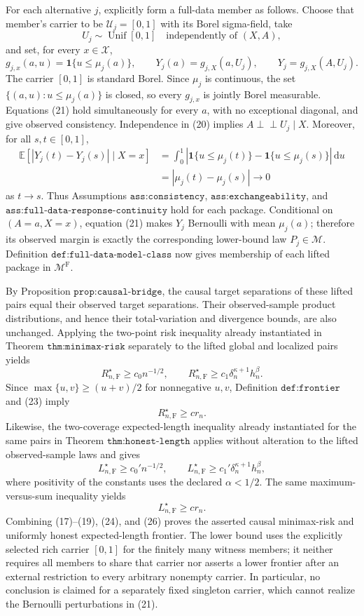 For each alternative \(j\), explicitly form a full-data member as follows. Choose that member's carrier to be \(\mathcal U_j=[0,1]\) with its Borel sigma-field, take
\[
 U_j\sim\operatorname{Unif}[0,1]
 \quad\text{independently of }(X,A),
\tag{20}
\]
and set, for every \(x\in\mathcal X\),
\[
 g_{j,x}(a,u)=\mathbf 1\{u\leq\mu_j(a)\},
 \qquad
 Y_j(a)=g_{j,X}(a,U_j),
 \qquad
 Y_j=g_{j,X}(A,U_j).
\tag{21}
\]
The carrier \([0,1]\) is standard Borel. Since \(\mu_j\) is continuous, the set \(\{(a,u):u\leq\mu_j(a)\}\) is closed, so every \(g_{j,x}\) is jointly Borel measurable. Equations (21) hold simultaneously for every \(a\), with no exceptional diagonal, and give observed consistency. Independence in (20) implies \(A\perp\!\!\!\perp U_j\mid X\). Moreover, for all \(s,t\in[0,1]\),
\[
\begin{aligned}
 \mathbb E[|Y_j(t)-Y_j(s)|\mid X=x]
 &=\int_0^1
   |\mathbf 1\{u\leq\mu_j(t)\}-\mathbf 1\{u\leq\mu_j(s)\}|\,\mathrm du\\
 &=|\mu_j(t)-\mu_j(s)|\longrightarrow0
\end{aligned}
\tag{22}
\]
as \(t\to s\). Thus Assumptions \(\texttt{ass:consistency}\), \(\texttt{ass:exchangeability}\), and \(\texttt{ass:full-data-response-continuity}\) hold for each package. Conditional on \((A=a,X=x)\), equation (21) makes \(Y_j\) Bernoulli with mean \(\mu_j(a)\); therefore its observed margin is exactly the corresponding lower-bound law \(P_j\in\mathcal M\). Definition \(\texttt{def:full-data-model-class}\) now gives membership of each lifted package in \(\mathcal M^{\mathrm F}\).

By Proposition \(\texttt{prop:causal-bridge}\), the causal target separations of these lifted pairs equal their observed target separations. Their observed-sample product distributions, and hence their total-variation and divergence bounds, are also unchanged. Applying the two-point risk inequality already instantiated in Theorem \(\texttt{thm:minimax-risk}\) separately to the lifted global and localized pairs yields
\[
 R_{n,\mathrm F}^\star
 \geq c_0 n^{-1/2},
 \qquad
 R_{n,\mathrm F}^\star
 \geq c_1\delta_n^{\kappa+1}h_n^\beta.
\tag{23}
\]
Since \(\max\{u,v\}\geq(u+v)/2\) for nonnegative \(u,v\), Definition \(\texttt{def:frontier}\) and (23) imply
\[
 R_{n,\mathrm F}^\star\geq c r_n.
\tag{24}
\]
Likewise, the two-coverage expected-length inequality already instantiated for the same pairs in Theorem \(\texttt{thm:honest-length}\) applies without alteration to the lifted observed-sample laws and gives
\[
 L_{n,\mathrm F}^\star\geq c_0' n^{-1/2},
 \qquad
 L_{n,\mathrm F}^\star\geq c_1'\delta_n^{\kappa+1}h_n^\beta,
\tag{25}
\]
where positivity of the constants uses the declared \(\alpha<1/2\). The same maximum-versus-sum inequality yields
\[
 L_{n,\mathrm F}^\star\geq cr_n.
\tag{26}
\]
Combining (17)--(19), (24), and (26) proves the asserted causal minimax-risk and uniformly honest expected-length frontier. The lower bound uses the explicitly selected rich carrier \([0,1]\) for the finitely many witness members; it neither requires all members to share that carrier nor asserts a lower frontier after an external restriction to every arbitrary nonempty carrier. In particular, no conclusion is claimed for a separately fixed singleton carrier, which cannot realize the Bernoulli perturbations in (21).